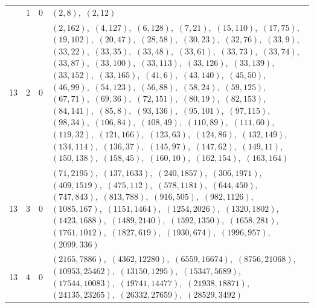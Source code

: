 \documentclass[11pt]{article}
\begin{document}
\begin{longtable}{@{}rrl>{\raggedright\arraybackslash}p{}@{}}
\addlinespace[3pt]
13 & 1 & $0$ & $(2,8)$,\allowbreak\ $(2,12)$\\
13 & 2 & $0$ & $(2,162)$,\allowbreak\ $(4,127)$,\allowbreak\ $(6,128)$,\allowbreak\ $(7,21)$,\allowbreak\ $(15,110)$,\allowbreak\ $(17,75)$,\allowbreak\ $(19,102)$,\allowbreak\ $(20,47)$,\allowbreak\ $(28,58)$,\allowbreak\ $(30,23)$,\allowbreak\ $(32,76)$,\allowbreak\ $(33,9)$,\allowbreak\ $(33,22)$,\allowbreak\ $(33,35)$,\allowbreak\ $(33,48)$,\allowbreak\ $(33,61)$,\allowbreak\ $(33,73)$,\allowbreak\ $(33,74)$,\allowbreak\ $(33,87)$,\allowbreak\ $(33,100)$,\allowbreak\ $(33,113)$,\allowbreak\ $(33,126)$,\allowbreak\ $(33,139)$,\allowbreak\ $(33,152)$,\allowbreak\ $(33,165)$,\allowbreak\ $(41,6)$,\allowbreak\ $(43,140)$,\allowbreak\ $(45,50)$,\allowbreak\ $(46,99)$,\allowbreak\ $(54,123)$,\allowbreak\ $(56,88)$,\allowbreak\ $(58,24)$,\allowbreak\ $(59,125)$,\allowbreak\ $(67,71)$,\allowbreak\ $(69,36)$,\allowbreak\ $(72,151)$,\allowbreak\ $(80,19)$,\allowbreak\ $(82,153)$,\allowbreak\ $(84,141)$,\allowbreak\ $(85,8)$,\allowbreak\ $(93,136)$,\allowbreak\ $(95,101)$,\allowbreak\ $(97,115)$,\allowbreak\ $(98,34)$,\allowbreak\ $(106,84)$,\allowbreak\ $(108,49)$,\allowbreak\ $(110,89)$,\allowbreak\ $(111,60)$,\allowbreak\ $(119,32)$,\allowbreak\ $(121,166)$,\allowbreak\ $(123,63)$,\allowbreak\ $(124,86)$,\allowbreak\ $(132,149)$,\allowbreak\ $(134,114)$,\allowbreak\ $(136,37)$,\allowbreak\ $(145,97)$,\allowbreak\ $(147,62)$,\allowbreak\ $(149,11)$,\allowbreak\ $(150,138)$,\allowbreak\ $(158,45)$,\allowbreak\ $(160,10)$,\allowbreak\ $(162,154)$,\allowbreak\ $(163,164)$\\
13 & 3 & $0$ & $(71,2195)$,\allowbreak\ $(137,1633)$,\allowbreak\ $(240,1857)$,\allowbreak\ $(306,1971)$,\allowbreak\ $(409,1519)$,\allowbreak\ $(475,112)$,\allowbreak\ $(578,1181)$,\allowbreak\ $(644,450)$,\allowbreak\ $(747,843)$,\allowbreak\ $(813,788)$,\allowbreak\ $(916,505)$,\allowbreak\ $(982,1126)$,\allowbreak\ $(1085,167)$,\allowbreak\ $(1151,1464)$,\allowbreak\ $(1254,2026)$,\allowbreak\ $(1320,1802)$,\allowbreak\ $(1423,1688)$,\allowbreak\ $(1489,2140)$,\allowbreak\ $(1592,1350)$,\allowbreak\ $(1658,281)$,\allowbreak\ $(1761,1012)$,\allowbreak\ $(1827,619)$,\allowbreak\ $(1930,674)$,\allowbreak\ $(1996,957)$,\allowbreak\ $(2099,336)$\\
13 & 4 & $0$ & $(2165,7886)$,\allowbreak\ $(4362,12280)$,\allowbreak\ $(6559,16674)$,\allowbreak\ $(8756,21068)$,\allowbreak\ $(10953,25462)$,\allowbreak\ $(13150,1295)$,\allowbreak\ $(15347,5689)$,\allowbreak\ $(17544,10083)$,\allowbreak\ $(19741,14477)$,\allowbreak\ $(21938,18871)$,\allowbreak\ $(24135,23265)$,\allowbreak\ $(26332,27659)$,\allowbreak\ $(28529,3492)$\\

\end{longtable}
\end{document}
